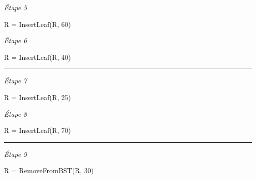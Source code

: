 \documentclass[11pt,a4paper]{article}
\begin{document}
\begin{center}
\begin{table}[ht!]
\begin{minipage}{0.33\textwidth}
\textit{\'Etape 5}

R = InsertLeaf(R, 60)

\vspace*{6cm}

  \end{minipage}
  \hfillx
  \begin{minipage}{0.33\textwidth}
    \centering

\textit{\'Etape 6}

R = InsertLeaf(R, 40)

\vspace*{6cm}

  \end{minipage}
\end{table}

\vspace*{-0.5cm}
\rule{1.0\linewidth}{0.75pt}


\begin{table}[ht!]
  \centering
  \begin{minipage}{0.50\textwidth}
    \centering

\textit{\'Etape 7}

R = InsertLeaf(R, 25)

\vspace*{7cm}

  \end{minipage}
  \hfillx
  \begin{minipage}{0.50\textwidth}
    \centering

\textit{\'Etape 8}

R = InsertLeaf(R, 70)

\vspace*{7cm}

  \end{minipage}
\end{table}


\vspace*{-0.5cm}
\rule{1.0\linewidth}{0.75pt}


\begin{table}[ht!]
  \centering
  \begin{minipage}{0.50\textwidth}
    \centering

\textit{\'Etape 9}

R = RemoveFromBST(R, 30)

\vspace*{7cm}


\end{minipage}
\end{table}
\end{center}
\end{document}
